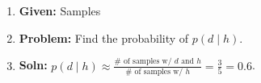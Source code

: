 \begin{example}
    \begin{enumerate}
        \item \textbf{Given:} Samples 
        \item \textbf{Problem:} Find the probability of $p(d \mid h)$.
        \item \textbf{Soln:} $p(d \mid h) \approx \frac{\# \text{ of samples w/ } d \text{ and } h}{\# \text{ of samples w/ } h} = \frac{3}{5} = 0.6$.
    \end{enumerate}
\end{example}